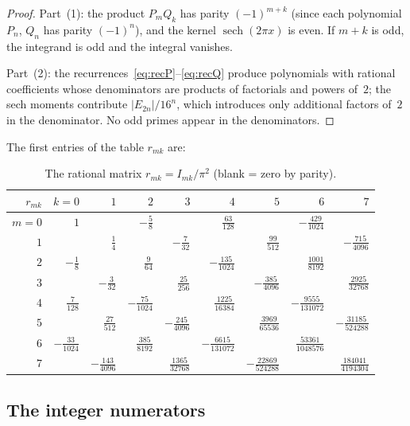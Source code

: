 \documentclass[11pt,a4paper]{article}
\begin{document}
\begin{proof}
Part~(1): the product $P_m Q_k$ has parity $(-1)^{m+k}$ (since
each polynomial $P_n$, $Q_n$ has parity $(-1)^n$), and the kernel
$\operatorname{sech}(2\pi x)$ is even. If $m+k$ is odd, the
integrand is odd and the integral vanishes.

Part~(2): the recurrences~\eqref{eq:recP}--\eqref{eq:recQ}
produce polynomials with rational coefficients whose denominators
are products of factorials and powers of~$2$; the sech moments
contribute $|E_{2n}|/16^n$, which introduces only additional
factors of~$2$ in the denominator. No odd primes appear in the
denominators.
\end{proof}

The first entries of the table $r_{mk}$ are:

\begin{table}[ht]
\centering
\caption{The rational matrix $r_{mk} = I_{mk}/\pi^2$
  (blank = zero by parity).}
\label{tab:rmk}
\small
\begin{tabular}{r|rrrrrrrr}
\toprule
$r_{mk}$ & $k{=}0$ & $1$ & $2$ & $3$ & $4$ & $5$ & $6$ & $7$ \\
\midrule
$m{=}0$ & $1$ && $-\frac{5}{8}$ && $\frac{63}{128}$
        && $-\frac{429}{1024}$ \\[3pt]
$1$ && $\frac{1}{4}$ && $-\frac{7}{32}$ && $\frac{99}{512}$
    && $-\frac{715}{4096}$ \\[3pt]
$2$ & $-\frac{1}{8}$ && $\frac{9}{64}$ && $-\frac{135}{1024}$
    && $\frac{1001}{8192}$ \\[3pt]
$3$ && $-\frac{3}{32}$ && $\frac{25}{256}$ && $-\frac{385}{4096}$
    && $\frac{2925}{32768}$ \\[3pt]
$4$ & $\frac{7}{128}$ && $-\frac{75}{1024}$ && $\frac{1225}{16384}$
    && $-\frac{9555}{131072}$ \\[3pt]
$5$ && $\frac{27}{512}$ && $-\frac{245}{4096}$ && $\frac{3969}{65536}$
    && $-\frac{31185}{524288}$ \\[3pt]
$6$ & $-\frac{33}{1024}$ && $\frac{385}{8192}$
    && $-\frac{6615}{131072}$ && $\frac{53361}{1048576}$ \\[3pt]
$7$ && $-\frac{143}{4096}$ && $\frac{1365}{32768}$
    && $-\frac{22869}{524288}$ && $\frac{184041}{4194304}$ \\
\bottomrule
\end{tabular}
\end{table}

\subsection{The integer numerators}
\end{document}
